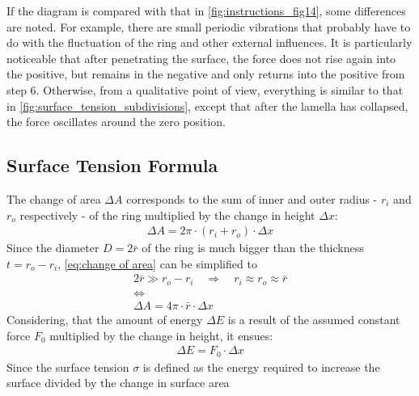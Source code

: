             If the diagram is compared with that in \cref{fig:instructions_fig14}, some differences are noted. For example, there are small
            periodic vibrations that probably have to do with the fluctuation of the ring and other external influences.
            It is particularly noticeable that after penetrating the surface, the force does not rise again into the
            positive, but remains in the negative and only returns into the positive from step 6. Otherwise, from a
            qualitative point of view, everything is similar to that in \cref{fig:surface_tension_subdivisions}, except that after the lamella has
            collapsed, the force oscillates around the zero position.
        \subsection{Surface Tension Formula}\label{sec:A2 derive eq.4}%
            The change of area \(\Delta A\) corresponds to the sum of inner and outer radius - \(r_i\) and \(r_o\) respectively - of
            the ring multiplied by the change in height \(\Delta x\):
            \begin{align}
                \Delta A = 2\pi \cdot (r_i + r_o) \cdot \Delta x
                \label{eq:change of area}
            \end{align}
            Since the diameter \(D = 2\bar{r}\) of the ring is much bigger than the thickness \(t = r_o - r_i\), \cref{eq:change of area}
            can be simplified to
            \begin{equation}
                \begin{gathered}
                    2\bar{r} \gg r_o-r_i \quad \Rightarrow \quad r_i \approx r_o \approx \bar{r} \\
                    \Leftrightarrow \\
                    \Delta A = 4\pi \cdot \bar{r} \cdot \Delta x
                    \label{eq:area}
                \end{gathered}
            \end{equation}
            Considering, that the amount of energy \(\Delta E\) is a result of the assumed constant force \(F_0\) multiplied
            by the change in height, it ensues:
            \begin{align}
                \Delta E = F_0 \cdot \Delta x
                \label{eq:energy}
            \end{align}
            Since the surface tension \(\sigma\) is defined as the energy required to increase the surface divided by the change in surface area
